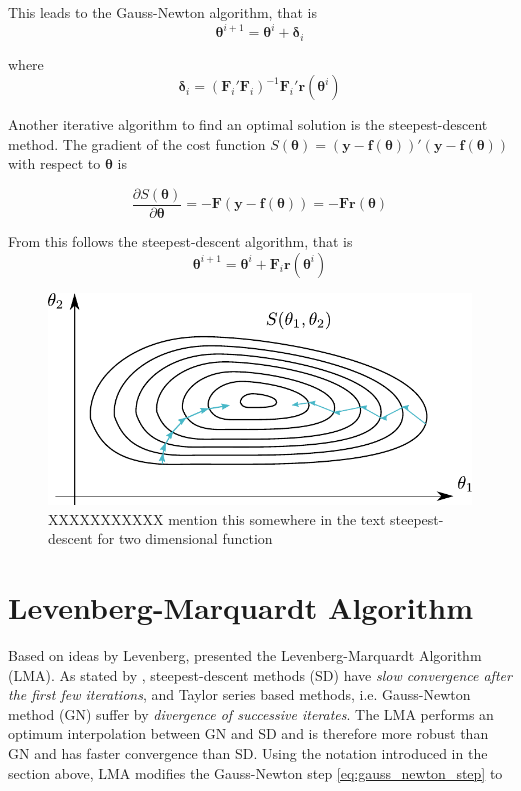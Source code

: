 This leads to the Gauss-Newton algorithm, that is
\begin{equation}
\boldsymbol{\theta}^{i+1} =
\boldsymbol{\theta}^{i} + \boldsymbol{\delta}_i
\end{equation}

where
\begin{equation}
\label{eq:gauss_newton_step}
\boldsymbol{\delta}_i = (\mathbf{F}_i' \mathbf{F}_i)^{-1} \mathbf{F}_i' \mathbf{r}(\boldsymbol{\theta}^{i})
\end{equation}

Another iterative algorithm to find an optimal solution is the steepest-descent method.
The gradient of the cost function 
$S(\boldsymbol{\theta}) = ( \mathbf{y} - \mathbf{f}(\boldsymbol{\theta}) )'
( \mathbf{y} - \mathbf{f}(\boldsymbol{\theta}) )$
with respect to $\boldsymbol{\theta}$ is

\begin{equation}
\frac{\partial S(\boldsymbol{\theta})}{\partial \boldsymbol{\theta}} = 
- \mathbf{F} ( \mathbf{y} - \mathbf{f}(\boldsymbol{\theta}) ) = 
- \mathbf{F}  \mathbf{r}(\boldsymbol{\theta}) 
\end{equation}

From this follows the steepest-descent algorithm, that is
\begin{equation}
\boldsymbol{\theta}^{i+1} =
\boldsymbol{\theta}^{i} +
\mathbf{F}_i \mathbf{r}(\boldsymbol{\theta}^{i})
\end{equation}

\begin{figure}[hbtp]
\centering
\includegraphics[width = 0.6 \textwidth]{images/steepest_descent.pdf}
\caption{XXXXXXXXXXX mention this somewhere in the text steepest-descent for two dimensional function}
\end{figure}



\section{Levenberg-Marquardt Algorithm}
Based on ideas by Levenberg, \citet{Marquardt1963} presented the Levenberg-Marquardt Algorithm (LMA).
As stated by \citeauthor{Marquardt1963},
steepest-descent methods (SD) have \textit{slow convergence after the first few iterations},
and Taylor series based methods, i.e. Gauss-Newton method (GN) suffer by \textit{divergence of successive iterates}.
The LMA performs an optimum interpolation between GN and SD
and is therefore more robust than GN and has faster convergence than SD.
Using the notation introduced in the section above, LMA modifies the Gauss-Newton step \eqref{eq:gauss_newton_step} to

